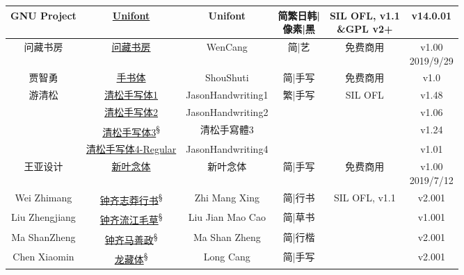 \documentclass{../../PublicResources/DocClass}
\begin{document}
{\begin{longtable}{|*{6}{c|}}
    \hline
    GNU Project & \href{http://unifoundry.com/unifont/}{Unifont} & Unifont & \makecell{简繁日韩| \\ 像素|黑}  & \makecell{SIL OFL, v1.1 \\ \&GPL v2+} & v14.0.01 \\
    \hline
    问藏书房 & \href{https://www.wencang.com/font.jsp}{问藏书房} & WenCang & 简|艺 & 免费商用 & \makecell{v1.00 \\ 2019/9/29}  \\
    \hline
    贾智勇 & \href{https://www.zcool.com.cn/work/ZMjI2MDk1MDg=.html}{手书体} & ShouShuti & 简|手写 & 免费商用 & v1.0 \\
    \hline
    \multirow{4}{*}{游清松} & \href{https://github.com/jasonhandwriting/JasonHandwriting}{清松手写体1} & JasonHandwriting1 & \multirow{4}{*}{繁|手写} & \multirow{4}{*}{SIL OFL} & v1.48 \\
    \cline{2-3}\cline{6-6}
    & \href{https://github.com/jasonhandwriting/JasonHandwriting}{清松手写体2} & JasonHandwriting2 & & & v1.06 \\
    \cline{2-3}\cline{6-6}
    & \href{https://github.com/jasonhandwriting/JasonHandwriting}{清松手写体3}\textsuperscript{\S} & 清松手寫體3 & & & v1.24 \\
    \cline{2-3}\cline{6-6}
    & \href{https://github.com/jasonhandwriting/JasonHandwriting}{清松手写体4-Regular} & JasonHandwriting4 & & & v1.01 \\
    \hline
    王亚设计 & \href{https://www.zcool.com.cn/work/ZMzc1MDI2Njg=.html}{新叶念体} & 新叶念体 & 简|手写 & 免费商用 & \makecell{v1.00 \\ 2019/7/12} \\
    \hline
    Wei Zhimang & \href{https://fonts.google.com/specimen/Zhi+Mang+Xing?subset=chinese-simplified}{钟齐志莽行书}\textsuperscript{\S} & Zhi Mang Xing & 简|行书 & \multirow{4}{*}{SIL OFL, v1.1} & v2.001 \\
    \cline{1-4}\cline{6-6}
    Liu Zhengjiang & \href{https://fonts.google.com/specimen/Liu+Jian+Mao+Cao?subset=chinese-simplified}{钟齐流江毛草}\textsuperscript{\S} & Liu Jian Mao Cao & 简|草书 & & v1.001 \\
    \cline{1-4}\cline{6-6}
    Ma ShanZheng & \href{https://fonts.google.com/specimen/Ma+Shan+Zheng?subset=chinese-simplified}{钟齐马善政}\textsuperscript{\S} & Ma Shan Zheng & 简|行楷 & & v2.001\\
    \cline{1-4}\cline{6-6}
    Chen Xiaomin  & \href{https://fonts.google.com/specimen/Long+Cang?subset=chinese-simplified}{龙藏体}\textsuperscript{\S} & Long Cang & 简|手写 & & v2.001\\

\end{longtable}}
\end{document}
